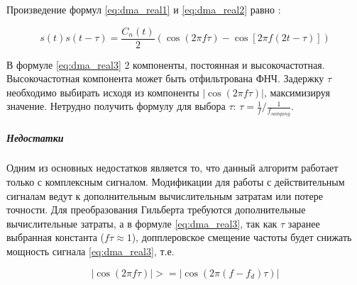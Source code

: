 Произведение формул \ref{eq:dma_real1} и \ref{eq:dma_real2} равно \cite{tsui}:
\begin{center}
\begin{equation}
	\label{eq:dma_real3}
	s(t)s(t - \tau) = \frac{C_n(t)}{2} \left(\cos (2\pi f \tau) - \cos \left[2 \pi f (2t - \tau)\right]\right)
\end{equation}
\end{center}

В формуле \ref{eq:dma_real3} 2 компоненты, постоянная и высокочастотная. Высокочастотная компонента
может быть отфильтрована ФНЧ. Задержку ${\tau}$ необходимо выбирать исходя из компоненты ${\left| \cos (2\pi f \tau) \right|}$,
максимизируя значение. Нетрудно получить формулу для выбора ${\tau}$: ${\tau = \frac{1}{f} / \frac{1}{f_{samping}}}$.

\subparagraph{Недостатки}
Одним из основных недостатков является то, что данный алгоритм работает только с комплексным сигналом. Модификации
для работы с действительным сигналам ведут к дополнительным вычислительным затратам или потере точности. Для
преобразования Гильберта требуются дополнительные вычислительные затраты, а в формуле \ref{eq:dma_real3}, так
как ${\tau}$ заранее выбранная константа (${f\tau \approx 1}$), допплеровское смещение частоты будет снижать мощность
сигнала \ref{eq:dma_real3}, т.е.
\begin{center}
\begin{equation}
	\left| \cos (2\pi f \tau) \right| >= \left| \cos (2\pi (f - f_d) \tau) \right|
\end{equation}
\end{center}

\newpage
